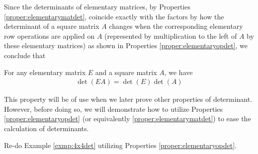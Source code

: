 Since the determinants of elementary matrices, by Properties \ref{proper:elementarymatdet}, coincide exactly with the factors by how the determinant of a square matrix $A$ changes when the corresponding elementary row operations are applied on $A$ (represented by multiplication to the left of $A$ by these elementary matrices) as shown in Properties \ref{proper:elementaryopdet}, we conclude that
\begin{proper}
\label{proper:elementarytimesdet}
For any elementary matrix $E$ and a square matrix $A$, we have
\begin{align}
\det(EA) = \det(E)\det(A)
\end{align}
\end{proper}
This property will be of use when we later prove other properties of determinant. However, before doing so, we will demonstrate how to utilize Properties \ref{proper:elementaryopdet} (or equivalently \ref{proper:elementarymatdet}) to ease the calculation of determinants.
\begin{exmp}
Re-do Example \ref{exmp:4x4det} utilizing Properties \ref{proper:elementaryopdet}.
\end{exmp}
